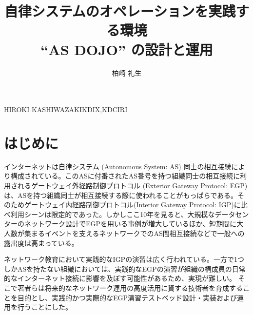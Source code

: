 \documentclass[Japanese]{dicomopapers}
\begin{document}
\title{自律システムのオペレーションを実践する環境\\ ``AS DOJO'' の設計と運用}



\author{柏崎 礼生}{HIROKI KASHIWAZAKI}{KDIX,KDCIRI}

\maketitle

\section{はじめに}

インターネットは自律システム (Autonomous System: AS) 同士の相互接続により構成されている。このASに付番されたAS番号を持つ組織同士の相互接続に利用されるゲートウェイ外経路制御プロトコル (Exterior Gateway Protocol: EGP) は、ASを持つ組織同士が相互接続する際に使われることがもっぱらである。そのためゲートウェイ内経路制御プロトコル(Interior Gateway Protocol: IGP)に比べ利用シーンは限定的であった。しかしここ10年を見ると、大規模なデータセンターのネットワーク設計でEGPを用いる事例が増大しているほか、短期間に大人数が集まるイベントを支えるネットワークでのAS間相互接続などで一般への露出度は高まっている。


ネットワーク教育において実践的なIGPの演習は広く行われている。一方で1つしかASを持たない組織においては、実践的なEGPの演習が組織の構成員の日常的なインターネット接続に影響を及ぼす可能性があるため、実現が難しい。
そこで著者らは将来的なネットワーク運用の高度活用に資する技術者を育成することを目的とし、実践的かつ実際的なEGP演習テストベッド設計・実装および運用を行うことにした。
\end{document}
